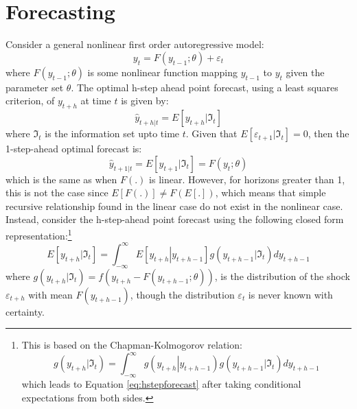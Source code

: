 \section{Forecasting}\label{sec:2}
Consider a general nonlinear first order autoregressive model:
\begin{equation}\label{eq:nonlinar1}
{y_t} = F\left( {{y_{t - 1}};\theta } \right) + {\varepsilon _t}
\end{equation}
where $ F\left( {{y_{t - 1}};\theta } \right)$ is some nonlinear function 
mapping $y_{t-1}$ to $y_t$ given the parameter set $\theta$. The optimal h-step
ahead  point forecast, using a least squares criterion, of $y_{t+h}$ at time $t$
is given by:
\begin{equation}
{{\hat y}_{t + h\left| t \right.}} = E\left[ {{y_{t + h}}\left| {{\Im _t}} \right.} \right]
\end{equation}
where $\Im_t$ is the information set upto time $t$. Given  that $E\left[
{{\varepsilon_{t + 1}}\left| {{\Im _t}} \right.} \right] = 0$, then the
1-step-ahead optimal forecast is:
\begin{equation}
{{\hat y}_{t + 1\left| t \right.}} = E\left[ {{y_{t + 1}}\left| {{\Im _t}} \right.} \right] = F\left( {{y_t};\theta } \right)
\end{equation}
which is the same as when $F(.)$ is linear. However, for horizons greater than
1, this is not the case since $E\left[ {F\left( . \right)} \right] \ne F\left(
{E\left[ . \right]} \right)$,  which means that simple recursive relationship 
found in the linear case do not exist in the nonlinear case. Instead, consider
the  h-step-ahead point forecast using the following closed form 
representation:\footnote{This is based on the Chapman-Kolmogorov relation:
\begin{equation}
g\left( {{y_{t + h}}\left| {{\Im _t}} \right.} \right) = \int_{ - \infty }^\infty  {g\left( {{y_{t + h}}\left| {{y_{t + h - 1}}} \right.} \right)g\left( {{y_{t + h - 1}}\left| {{\Im _t}} \right.} \right)d{y_{t + h - 1}}}
\end{equation}
which leads to Equation \ref{eq:hstepforecast} after taking conditional expectations from both sides.
}
\begin{equation}\label{eq:hstepforecast}
E\left[ {{y_{t + h}}\left| {{\Im _t}} \right.} \right] = \int_{ - \infty }^\infty  {E\left[ {{y_{t + h}}\left| {{y_{t + h - 1}}} \right.} \right]g\left( {{y_{t + h - 1}}\left| {{\Im _t}} \right.} \right)d{y_{t + h - 1}}}
\end{equation}
where $g\left( {{y_{t + h}}\left| {{\Im _t}} \right.} \right) = f\left( {{y_{t + h}} - F\left( {{y_{t + h - 1}};\theta } \right)} \right)$, is the distribution of the shock $\varepsilon_{t+h}$ with mean $F\left( {y_{t + h - 1}}\right)$, though the distribution $\varepsilon_t$ is never known with certainty.
